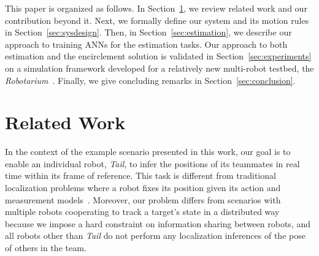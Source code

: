 \documentclass[letterpaper, 10 pt, conference]{ieeeconf}  %
\begin{document}
	
	This paper is organized as follows. In Section~\ref{sec:related_work},
	we review related work and our contribution beyond it. Next, we formally
	define our system and its motion rules in Section~\ref{sec:sysdesign}.
	Then, in Section~\ref{sec:estimation}, we describe our approach to
	training ANNs for the estimation tasks. Our approach to both estimation
	and the encirclement solution is validated in
	Section~\ref{sec:experiments} on a simulation framework developed for a
	relatively new multi-robot testbed, the
	\emph{Robotarium}~\cite{PWGDMAFE16}. Finally, we give concluding remarks
	in Section~\ref{sec:conclusion}.
	
	\section{Related Work}
	\label{sec:related_work}
	
	In the context of the example scenario presented in this work, our goal
	is to enable an individual robot, \emph{Tail}, to infer the positions of
	its teammates in real time within its frame of reference. This task is
	different from traditional localization problems where a robot fixes its
	position given its action and measurement models~\cite{Thrun05}.
	Moreover, our problem differs from scenarios with multiple robots
	cooperating to track a target's state in a distributed way~\cite{FSDO10,
		CX14, DMG15} because we impose a hard constraint on information sharing
	between robots, and all robots other than \emph{Tail} do not perform any
	localization inferences of the pose of others in the team.
	
\end{document}
